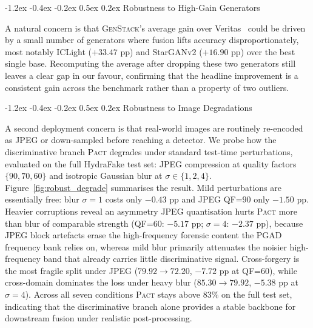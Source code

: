 \documentclass[10pt,twocolumn,letterpaper]{article}
\makeatletter
\renewcommand\subsection{\@startsection{subsection}{2}{\z@}%
  {-1.2ex \@plus -0.4ex \@minus -0.2ex}%
  {0.5ex \@plus 0.2ex}%
  {\normalfont\normalsize\bfseries}}
\newcommand{\vfive}{\textsc{Pact}}
\makeatother
\begin{document}
\subsection{Robustness to High-Gain Generators}
\label{sec:robustness_gens}

A natural concern is that \textsc{GenStack}'s average gain over Veritas~\cite{veritas} could be driven by a small number of generators where fusion lifts accuracy disproportionately, most notably ICLight ($+33.47$ pp) and StarGANv2 ($+16.90$ pp) over the best single base. Recomputing the average after dropping these two generators still leaves a clear gap in our favour, confirming that the headline improvement is a consistent gain across the benchmark rather than a property of two outliers.

\subsection{Robustness to Image Degradations}
\label{sec:robustness_degrade}

A second deployment concern is that real-world images are routinely re-encoded as JPEG or down-sampled before reaching a detector. We probe how the discriminative branch \vfive{} degrades under standard test-time perturbations, evaluated on the full HydraFake test set: JPEG compression at quality factors $\{90, 70, 60\}$ and isotropic Gaussian blur at $\sigma\in\{1, 2, 4\}$. Figure~\ref{fig:robust_degrade} summarises the result. Mild perturbations are essentially free: blur $\sigma{=}1$ costs only $-0.43$ pp and JPEG QF=$90$ only $-1.50$ pp. Heavier corruptions reveal an asymmetry  JPEG quantisation hurts \vfive{} more than blur of comparable strength (QF=$60$: $-5.17$ pp; $\sigma{=}4$: $-2.37$ pp), because JPEG block artefacts erase the high-frequency forensic content the PGAD frequency bank relies on, whereas mild blur primarily attenuates the noisier high-frequency band that already carries little discriminative signal. Cross-forgery is the most fragile split under JPEG ($79.92\!\to\!72.20$, $-7.72$ pp at QF=$60$), while cross-domain dominates the loss under heavy blur ($85.30\!\to\!79.92$, $-5.38$ pp at $\sigma{=}4$). Across all seven conditions \vfive{} stays above $83\%$ on the full test set, indicating that the discriminative branch alone provides a stable backbone for downstream fusion under realistic post-processing.
\end{document}
